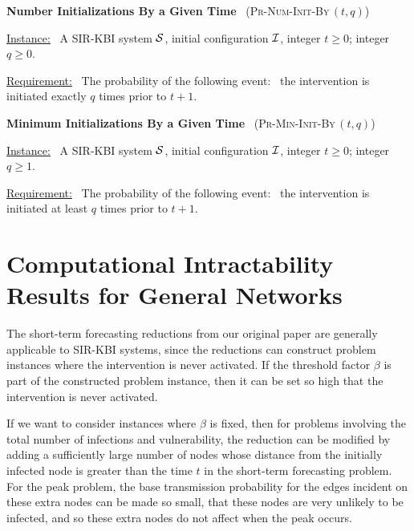 \documentclass[11pt]{article}
\newcommand{\cali}{\mbox{${\cal I}$}}
\newcommand{\cals}{\mbox{${\cal S}$}}
\newcommand{\NumInitsBy}{\mbox{\textsc{Pr-Num-Init-By}$\,(t,q)$}}
\newcommand{\MinInitsBy}{\mbox{\textsc{Pr-Min-Init-By}$\,(t,q)$}}
\begin{document}
\bigskip
\noindent
\textbf{Number Initializations By a Given Time}~ (\NumInitsBy)

\medskip
\noindent
\underline{Instance:}~ A SIR-KBI system \cals,
initial configuration \cali, integer $t \geq 0$; integer $q \geq 0$.

\smallskip
\noindent
\underline{Requirement:}~ The probability of the following
event:~ the intervention is initiated exactly $q$ times prior to $t+1$.


\bigskip
\noindent
\textbf{Minimum Initializations By a Given Time}~ (\MinInitsBy)

\medskip
\noindent
\underline{Instance:}~ A SIR-KBI system \cals,
initial configuration \cali, integer $t \geq 0$; integer $q \geq 1$.

\smallskip
\noindent
\underline{Requirement:}~ The probability of the following
event:~ the intervention is initiated at least $q$ times prior to $t+1$.









\bigskip

\section{Computational Intractability Results for General Networks}
\label{sec:general_results}

The short-term forecasting reductions from our original paper 
are generally applicable to SIR-KBI systems,
since the reductions can construct problem instances where the intervention is never activated.
If the threshold factor $\beta$ is part of the constructed problem instance,
then it can be set so high that the intervention is never activated.

If we want to consider instances where $\beta$ is fixed,
then for problems involving the total number of infections and vulnerability,
the reduction can be modified by adding a sufficiently large number of nodes 
whose distance from the initially infected node is greater than the time $t$
in the short-term forecasting problem.
For the peak problem, 
the base transmission probability for the edges incident on these extra nodes can be made so small, 
that these nodes are very unlikely to be infected, 
and so these extra nodes do not affect when the peak occurs. 
\end{document}
